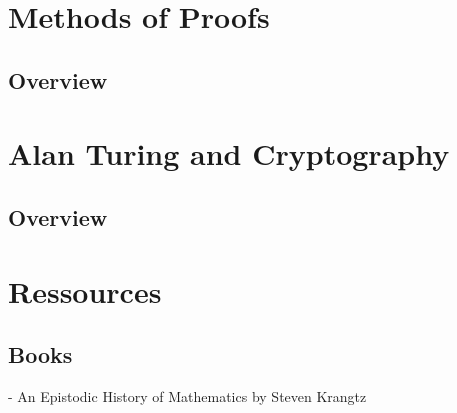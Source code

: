 \documentclass{article}
\begin{document}
\section{Methods of Proofs}
\subsection{Overview}%
\label{sub:Overview}
\section{Alan Turing and Cryptography}
\subsection{Overview}%
\label{sub:Overview}

\section{Ressources}%
\label{sec:Ressources}

\subsection{Books}%
\label{sub:Books}

- An Epistodic History of Mathematics by Steven Krangtz
\end{document}
